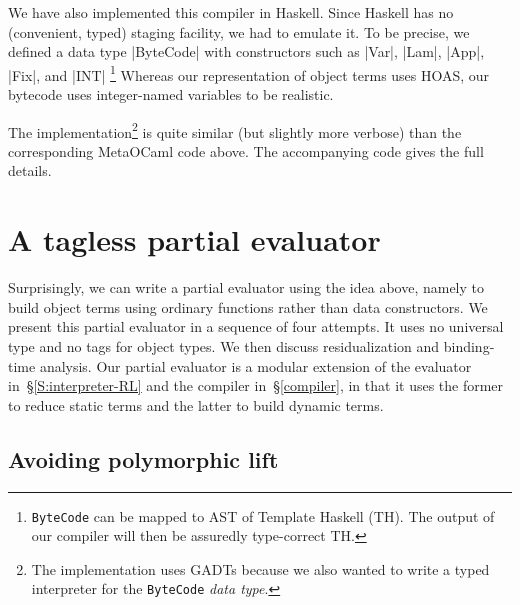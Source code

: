 We have also implemented this compiler in Haskell. 
Since Haskell
has no (convenient, typed) staging facility, we had to emulate
it. To be precise, we defined a data type |ByteCode| with
constructors such as |Var|, |Lam|, |App|, |Fix|, and |INT|%
\footnote{\texttt{ByteCode} can be mapped to AST of Template Haskell
  (TH). The output of our compiler will then be assuredly type-correct TH.}
Whereas our representation of object terms uses HOAS,
our bytecode uses integer-named
variables to be realistic. 
\begin{comment}
We then define 
\begin{code}
newtype C t = C (Int -> (ByteCode t, Int)) 
\end{code}
where |Int| is the counter for creating fresh variable
names. We define the compiler by making |C| an instance of the
class |Symantics|.
\end{comment}
The implementation\footnote{The implementation uses
GADTs because we also wanted to write a typed interpreter for 
the \texttt{ByteCode} \emph{data type}.} is quite similar (but slightly more
verbose) than the corresponding MetaOCaml code above. The
accompanying code gives the full details.

\section{A tagless partial evaluator}\label{PE}

Surprisingly, we can write a partial evaluator using the idea above,
namely to build object terms using ordinary functions rather than data
constructors.  We present this partial evaluator in a sequence of four
attempts. It uses no universal type and no tags
for object types.  We then discuss residualization and binding-time
analysis.  Our partial evaluator is a modular extension of the evaluator
in~\S\ref{S:interpreter-RL} and the compiler in~\S\ref{compiler}, in
that it uses the former to reduce static terms and the latter to build
dynamic terms.

\subsection{Avoiding polymorphic lift}
\label{S:PE-lift}

